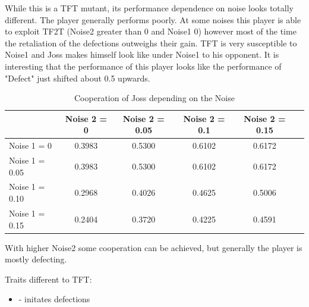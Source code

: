 While this is a TFT mutant, its performance dependence on noise looks totally different. The player generally performs poorly. At some noises this player is able to exploit TF2T (Noise2 greater than 0 and Noise1 0) however most of the time the retaliation of the defections outweighs their gain. TFT is very susceptible to Noise1 and Joss makes himself look like under Noise1 to his opponent. It is interesting that the performance of this player looks like the performance of "Defect" just shifted about 0.5 upwards.

\begin{table}[h]
 \begin{center}
\caption{Cooperation of Joss depending on the Noise} \vspace{3mm}
\begin{tabular}{|l|c|c|c|c|c|}
\hline
   	& Noise 2 = 0 & Noise 2 = 0.05& Noise 2 = 0.1& Noise 2 = 0.15 \\
  \hline
  Noise 1 = 0 	&            0.3983  &  0.5300  &  0.6102  &  0.6172 \\
 \hline
  Noise 1 = 0.05	 &          0.3983 &   0.5300  &  0.6102 &  0.6172 \\
 \hline
  Noise 1 = 0.10 	&        0.2968  &  0.4026  &  0.4625    &0.5006 \\
 \hline
  Noise 1 = 0.15 	&     0.2404    &0.3720 &   0.4225  &  0.4591 \\
 \hline
\end{tabular}
 \end{center}
\end{table}

With higher Noise2 some cooperation can be achieved, but generally the player is mostly defecting.

Traits different to TFT:

\renewcommand{\labelitemi}{}
\begin{itemize}
	\item - initates defections
\end{itemize}
\renewcommand{\labelitemi}{$\bullet$}


\newpage
